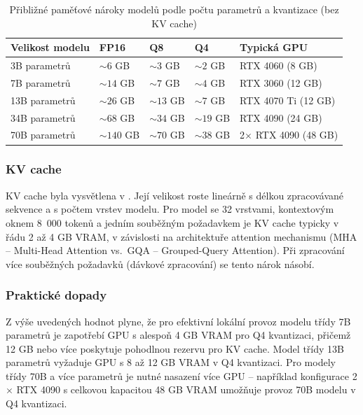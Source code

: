 \begin{table}[H]
    \centering
    \begin{tabular}{lllll}
        \toprule
        \textbf{Velikost modelu} & \textbf{FP16} & \textbf{Q8} & \textbf{Q4} & \textbf{Typická GPU} \\
        \midrule
        3B parametrů   & $\sim 6$ GB   & $\sim 3$ GB   & $\sim 2$ GB   & RTX 4060 (8 GB) \\
        7B parametrů   & $\sim 14$ GB  & $\sim 7$ GB   & $\sim 4$ GB   & RTX 3060 (12 GB) \\
        13B parametrů  & $\sim 26$ GB  & $\sim 13$ GB  & $\sim 7$ GB   & RTX 4070 Ti (12 GB) \\
        34B parametrů  & $\sim 68$ GB  & $\sim 34$ GB  & $\sim 19$ GB  & RTX 4090 (24 GB) \\
        70B parametrů  & $\sim 140$ GB & $\sim 70$ GB  & $\sim 38$ GB  & 2$\times$ RTX 4090 (48 GB) \\
        \bottomrule
    \end{tabular}
    \caption{Přibližné paměťové nároky modelů podle počtu parametrů a kvantizace (bez KV cache)}
    \label{tab:memory-requirements}
\end{table}

\subsubsection*{KV cache}
\label{subsubsec:kv-cache}

KV cache byla vysvětlena v .
Její velikost roste lineárně s délkou zpracovávané sekvence a s počtem vrstev modelu.
Pro model se 32 vrstvami, kontextovým oknem 8~000 tokenů a jedním souběžným požadavkem je KV cache typicky v řádu 2 až 4 GB VRAM, v závislosti na architektuře attention mechanismu
(MHA -- Multi-Head Attention vs.\ GQA -- Grouped-Query Attention).
Při zpracování více souběžných požadavků (dávkové zpracování) se tento nárok násobí.

\subsubsection*{Praktické dopady}
\label{subsubsec:practical-memory-implications}

Z výše uvedených hodnot plyne, že pro efektivní lokální provoz modelu třídy 7B parametrů je zapotřebí GPU s alespoň 4 GB VRAM pro Q4 kvantizaci, přičemž 12 GB nebo více poskytuje pohodlnou rezervu pro KV cache.
Model třídy 13B parametrů vyžaduje GPU s 8 až 12 GB VRAM v Q4 kvantizaci.
Pro modely třídy 70B a více parametrů je nutné nasazení více GPU -- například konfigurace 2$\times$ RTX 4090 s celkovou kapacitou 48 GB VRAM umožňuje provoz 70B modelu v Q4 kvantizaci.


\endinput
